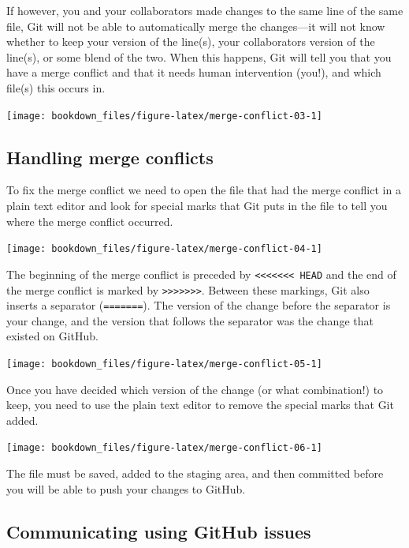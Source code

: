 \documentclass[
]{krantz}
\begin{document}
If however, you and your collaborators made changes to the same line of the same
file, Git will not be able to automatically merge the changes---it will not know whether to keep your version of the line(s), your
collaborators version of the line(s), or some blend of the two. When this
happens, Git will tell you that you have a merge conflict and that it needs
human intervention (you!), and which file(s) this occurs in.

\texttt{[image: bookdown\_files/figure-latex/merge-conflict-03-1]}

\hypertarget{handling-merge-conflicts}{%
\subsection{Handling merge conflicts}\label{handling-merge-conflicts}}

To fix the merge conflict we need to open the file that had the merge
conflict in a plain text editor and look for special marks that Git puts in the
file to tell you where the merge conflict occurred.

\texttt{[image: bookdown\_files/figure-latex/merge-conflict-04-1]}

The beginning of the merge
conflict is preceded by \texttt{\textless{}\textless{}\textless{}\textless{}\textless{}\textless{}\textless{}\ HEAD} and the end of the merge conflict is
marked by \texttt{\textgreater{}\textgreater{}\textgreater{}\textgreater{}\textgreater{}\textgreater{}\textgreater{}}. Between these markings, Git also inserts a separator
(\texttt{=======}). The version of the change before the separator is your change, and
the version that follows the separator was the change that existed on GitHub.

\texttt{[image: bookdown\_files/figure-latex/merge-conflict-05-1]}

Once you have decided which version of the change (or what combination!) to keep, you need to use the
plain text editor to remove the special marks that Git added.

\texttt{[image: bookdown\_files/figure-latex/merge-conflict-06-1]}

The file must be saved, added to the staging area, and then committed before you will be able to
push your changes to GitHub.

\hypertarget{communicating-using-github-issues}{%
\subsection{Communicating using GitHub issues}\label{communicating-using-github-issues}}
\end{document}
